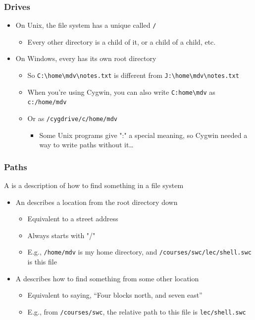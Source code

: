 \begin{frame}[fragile]\frametitle{Drives}
\begin{itemize}
\item On Unix, the file system has a unique  called \lstinline!/!
\begin{itemize}
    \item Every other directory is a child of it, or a child of a child, etc.
\end{itemize}
\item On Windows, every  has its own root directory
\begin{itemize}
    \item So \lstinline!C:\home\mdv\notes.txt! is different from \lstinline!J:\home\mdv\notes.txt!
    \item When you're using Cygwin, you can also write \lstinline!C:home\mdv! 
 as \lstinline!c:/home/mdv!
    \item Or as \lstinline!/cygdrive/c/home/mdv!
\begin{itemize}
          \item Some Unix programs give ":" a special meaning, so Cygwin needed a way to write paths without it…
\end{itemize}
\end{itemize}
\end{itemize}
\end{frame}

\begin{frame}[fragile]\frametitle{Paths}
A  is a description of how to find something in a file system
\begin{itemize}
    \item An  describes a location from the root directory down
\begin{itemize}
          \item Equivalent to a street address
          \item Always starts with "/"
          \item E.g., \lstinline{/home/mdv} is my home directory, and \lstinline{/courses/swc/lec/shell.swc} is this file
\end{itemize}
    \item A  describes how to find something from some other location
\begin{itemize}
          \item Equivalent to saying, “Four blocks north, and seven east”
          \item E.g., from \lstinline!/courses/swc!, the relative path to this file 
	is \lstinline!lec/shell.swc!
\end{itemize}
\end{itemize}
\end{frame}

